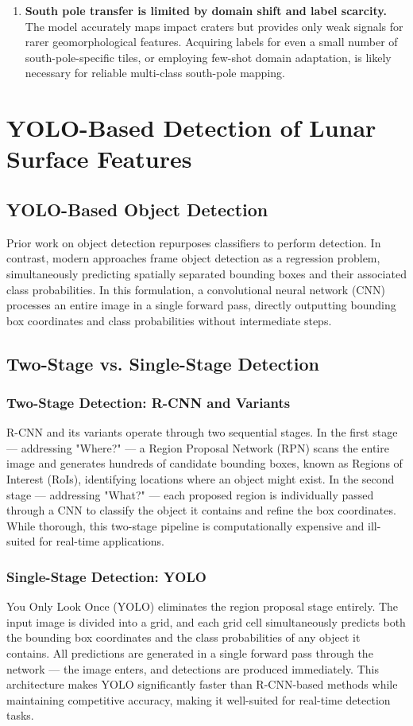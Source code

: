 \documentclass{aa}
\begin{document}
\begin{enumerate}
    \item \textbf{South pole transfer is limited by domain shift and label scarcity.} The model accurately maps impact craters but provides only weak signals for rarer geomorphological features. Acquiring labels for even a small number of south-pole-specific tiles, or employing few-shot domain adaptation, is likely necessary for reliable multi-class south-pole mapping.
\end{enumerate}

\section{YOLO-Based Detection of Lunar Surface Features}

\subsection{YOLO-Based Object Detection} 
Prior work on object detection repurposes classifiers to perform detection. In contrast, modern approaches frame object detection as a regression problem, simultaneously predicting spatially separated bounding boxes and their associated class probabilities. In this formulation, a convolutional neural network (CNN) processes an entire image in a single forward pass, directly outputting bounding box coordinates and class probabilities without intermediate steps.
\subsection{Two-Stage vs. Single-Stage Detection}
\subsubsection{Two-Stage Detection: R-CNN and Variants}
R-CNN and its variants operate through two sequential stages. In the first stage — addressing "Where?" — a Region Proposal Network (RPN) scans the entire image and generates hundreds of candidate bounding boxes, known as Regions of Interest (RoIs), identifying locations where an object might exist. In the second stage — addressing "What?" — each proposed region is individually passed through a CNN to classify the object it contains and refine the box coordinates. While thorough, this two-stage pipeline is computationally expensive and ill-suited for real-time applications.
\subsubsection{Single-Stage Detection: YOLO}
You Only Look Once (YOLO) eliminates the region proposal stage entirely. The input image is divided into a grid, and each grid cell simultaneously predicts both the bounding box coordinates and the class probabilities of any object it contains. All predictions are generated in a single forward pass through the network — the image enters, and detections are produced immediately. This architecture makes YOLO significantly faster than R-CNN-based methods while maintaining competitive accuracy, making it well-suited for real-time detection tasks.
\end{document}
